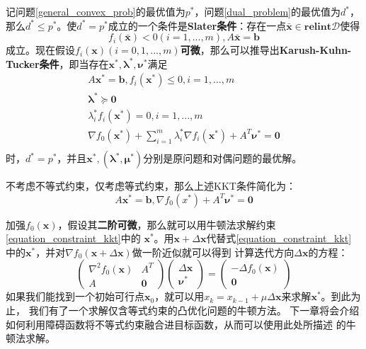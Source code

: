 \documentclass{article}
\begin{document}
记问题\ref{general_convex_prob}的最优值为$p^*$，问题\ref{dual_problem}的最优值为$d^*$，
那么$d^*\le p^*$。使$d^*=p^*$成立的一个条件是\textbf{Slater条件}：存在一点$\bar{\bm x}\in \textbf{relint}\mathcal D$使得
$$f_i(\bar{\bm x})<0(i=1,...,m),A\bar{\bm x}=\bm b$$
成立。现在假设$f_i(\bm x)(i=0,1,...,m)$\textbf{可微}，那么可以推导出\textbf{Karush-Kuhn-Tucker条件}，即当存在$\bm x^*,\bm\lambda^*,\bm\nu^*$满足
\begin{equation}
    \label{kkt}
    \begin{gathered}
    A\bm x^*=\bm b,f_i(\bm x^*)\le 0,i=1,...,m \\
    \bm\lambda^*\succeq \bm 0 \\
    \lambda^*_if_i(\bm x^*)=0,i=1,...,m\\
    \nabla f_0(\bm x^*)+\sum_{i=1}^m{\lambda^*_i}\nabla f_i(\bm x^*)+A^T\bm\nu^*=\bm 0\\
    \end{gathered}
\end{equation}
时，$d^*=p^*$，并且$\bm x^*,(\bm\lambda^*,\bm\mu^*)$分别是原问题和对偶问题的最优解。

不考虑不等式约束，仅考虑等式约束，那么上述KKT条件简化为：
\begin{equation}
    A\bm x^*=\bm b,\nabla f_0(x^*)+A^T\bm\nu ^*=\bm 0\label{equation_constraint_kkt}
\end{equation}

加强$f_0(\bm x)$，假设其\textbf{二阶可微}，那么就可以用牛顿法求解约束\eqref{equation_constraint_kkt}中的
$\bm x^*$。用$\bm x+\Delta \bm x$代替式\eqref{equation_constraint_kkt}
中的$\bm x^*$，并对$\nabla f_0(\bm x+\Delta \bm x)$做一阶近似就可以得到
计算迭代方向$\Delta \bm x$的方程：
\begin{equation}
\begin{pmatrix}
    \nabla^2f_0(\bm x) & A^T\\
    A & \bm 0
\end{pmatrix}
\begin{pmatrix}
    \Delta \bm x\\
    \bm\nu^*
\end{pmatrix}=
\begin{pmatrix}
    -\Delta f_0(\bm x)\\
    \bm 0
\end{pmatrix}\label{newton_for_equation}\end{equation}
如果我们能找到一个初始可行点$\bm x_0$，就可以用$x_k=x_{k-1}+\mu \Delta \bm x$来求解$\bm x^*$。到此为止，
我们有了一个求解仅含等式约束的凸优化问题的牛顿方法。
下一章将会介绍如何利用障碍函数将不等式约束融合进目标函数，从而可以使用此处所描述
的牛顿法求解。
\label{text4_2}
\end{document}

